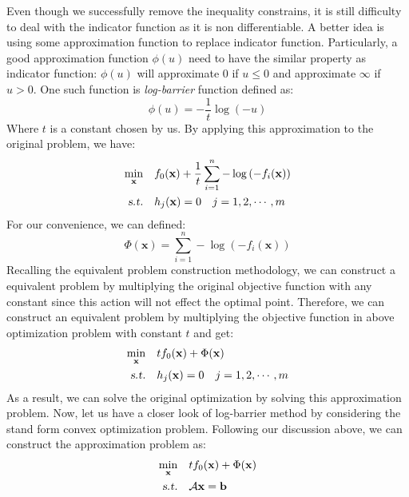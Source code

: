 \documentclass[10pt,a4paper]{article}
\begin{document}
Even though we successfully remove the inequality constrains, it is still difficulty to deal with the indicator function as it is non differentiable. A better idea is using some approximation function to replace indicator function. Particularly, a good approximation function $\phi(u)$ need to have the similar property as indicator function: $\phi(u)$ will approximate 0 if $u \leq 0$ and approximate $\infty$ if $u > 0$. One such function is \textit{log-barrier} function defined as:
\begin{equation*}
	\phi(u) = -\frac{1}{t}\log{(-u)}
\end{equation*}
Where $t$ is a constant chosen by us. By applying this approximation to the original problem, we have:
\begin{equation*}
	\begin{aligned}
		\displaystyle\min_{\mathbf{x}} \quad & f_{0}(\mathbf{x}) + \frac{1}{t} \displaystyle\sum_{i = 1}^{n} -\log{(- f_{i}(\mathbf{x}))} \\
		\textsl{s.t.} \quad & h_{j}(\mathbf{x}) = 0 \quad j = 1, 2, \cdots, m
	\end{aligned}
\end{equation*}
For our convenience, we can defined:
\begin{equation*}
	\Phi(\mathbf{x}) = \displaystyle\sum_{i = 1}^{n} -\log{(- f_{i}(\mathbf{x}))}
\end{equation*}
Recalling the equivalent problem construction methodology, we can construct a equivalent problem by multiplying the original objective function with any constant since this action will not effect the optimal point. Therefore, we can construct an equivalent problem by multiplying the objective function in above optimization problem with constant $t$ and get:
\begin{equation*}
	\begin{aligned}
		\displaystyle\min_{\mathbf{x}} \quad & t f_{0}(\mathbf{x}) + \Phi(\mathbf{x}) \\
		\textsl{s.t.} \quad & h_{j}(\mathbf{x}) = 0 \quad j = 1, 2, \cdots, m
	\end{aligned}
\end{equation*} 
As a result, we can solve the original optimization by solving this approximation problem. Now, let us have a closer look of log-barrier method by considering the stand form convex optimization problem. Following our discussion above, we can construct the approximation problem as:
\begin{equation*}
	\begin{aligned}
		\displaystyle\min_{\mathbf{x}} \quad & t f_{0}(\mathbf{x}) + \Phi(\mathbf{x}) \\
		\textsl{s.t.} \quad & \mathcal{A}\mathbf{x} = \mathbf{b}
	\end{aligned}
\end{equation*} 
\end{document}
